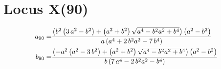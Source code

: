 \documentclass[11pt]{amsart}
\theoremstyle{plain}
\theoremstyle{definition}
\begin{document}
         \section{Locus X(90) }
     \[   \aligned
     a_{ 90}=&   {\frac { \left( {b}^{2} \left( 3\,{a}^{2}-{b}^{2} \right) + \left( {a}
     		^{2}+{b}^{2} \right) \sqrt {{a}^{4}-{b}^{2}{a}^{2}+{b}^{4}} \right) 
     		\left( {a}^{2}-{b}^{2} \right) }{a \left( {a}^{4}+2\,{b}^{2}{a}^{2}-7
     		\,{b}^{4} \right) }}
      \\
     b_{90}=&  {\frac { \left( -{a}^{2} \left( {a}^{2}-3\,{b}^{2} \right) + \left( {
     			a}^{2}+{b}^{2} \right) \sqrt {{a}^{4}-{b}^{2}{a}^{2}+{b}^{4}} \right) 
     		\left( {a}^{2}-{b}^{2} \right) }{b \left( 7\,{a}^{4}-2\,{b}^{2}{a}^{2
     		}-{b}^{4} \right) }}
     \endaligned
     \]
\end{document}
